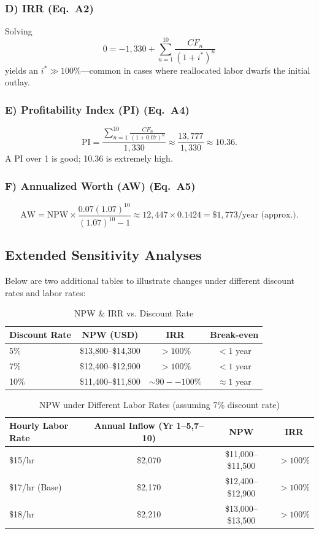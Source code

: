 \documentclass[12pt]{report}
\begin{document}
\subsubsection{D) IRR (Eq.~A2)}
Solving
\[
0 = -1{,}330 + \sum_{n=1}^{10} \frac{CF_n}{(1 + i^*)^n}
\]
yields an $i^* \gg 100\%$—common in cases where reallocated labor dwarfs the initial outlay.

\subsubsection{E) Profitability Index (PI) (Eq.~A4)}
\[
\text{PI} 
= \frac{\sum_{n=1}^{10}\frac{CF_n}{(1+0.07)^n}}{1{,}330}
\approx \frac{13{,}777}{1{,}330}
\approx 10.36.
\]
A PI over 1 is good; 10.36 is extremely high.

\subsubsection{F) Annualized Worth (AW) (Eq.~A5)}
\[
\text{AW} 
= \text{NPW} \times \frac{0.07(1.07)^{10}}{(1.07)^{10}-1}
\approx 12{,}447 \times 0.1424 
= \$1{,}773 / \text{year (approx.)}.
\]

\newpage
\subsection{Extended Sensitivity Analyses}

Below are two additional tables to illustrate changes under different discount rates and labor rates:

\begin{table}[h]
\centering
\caption{NPW \& IRR vs. Discount Rate}
\label{tab:sensitivity-discount}
\begin{tabular}{@{}lccc@{}}
\toprule
\textbf{Discount Rate} & \textbf{NPW (USD)} & \textbf{IRR} & \textbf{Break-even}\\
\midrule
5\% & \$13,800--\$14,300 & $>100\%$ & $<1$ year \\
7\% & \$12,400--\$12,900 & $>100\%$ & $<1$ year \\
10\% & \$11,400--\$11,800 & $\sim90--100\%$ & $\approx1$ year \\
\bottomrule
\end{tabular}
\end{table}

\begin{table}[h]
\centering
\caption{NPW under Different Labor Rates (assuming 7\% discount rate)}
\label{tab:sensitivity-labor}
\begin{tabular}{@{}lccc@{}}
\toprule
\textbf{Hourly Labor Rate} & \textbf{Annual Inflow (Yr 1--5,7--10)} & \textbf{NPW} & \textbf{IRR}\\
\midrule
\$15/hr & \$2,070 & \$11,000--\$11,500 & $>100\%$ \\
\$17/hr (Base) & \$2,170 & \$12,400--\$12,900 & $>100\%$ \\
\$18/hr & \$2,210 & \$13,000--\$13,500 & $>100\%$ \\
\bottomrule
\end{tabular}
\end{table}
\end{document}
